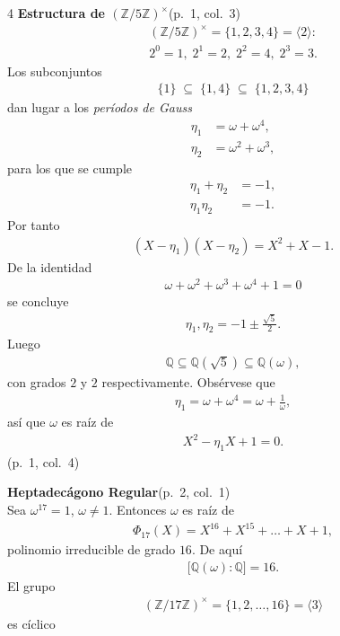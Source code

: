 \documentclass[landscape,a4paper]{article}
\begin{document}
\begin{multicols}{4}
\noindent\textbf{Estructura de $(\mathbb{Z}/5\mathbb{Z})^{\times}$}\hfill (p.~1, col.~3)\\
\begin{align*}
(\mathbb{Z}/5\mathbb{Z})^{\times}=\{1,2,3,4\}=\langle 2\rangle:
\\2^{0}=1,\;2^{1}=2,\;2^{2}=4,\;2^{3}=3.
\end{align*}
Los subconjuntos
\begin{align*}
\{1\}\;\subseteq\;\{1,4\}\;\subseteq\;\{1,2,3,4\}
\end{align*}
dan lugar a los \emph{períodos de Gauss}
\begin{align*}
\eta_{1}&=\omega+\omega^{4},\\
\eta_{2}&=\omega^{2}+\omega^{3},
\end{align*}
para los que se cumple
\begin{align*}
\eta_{1}+\eta_{2}&=-1,\\
\eta_{1}\eta_{2}&=-1.
\end{align*}
Por tanto
\begin{align*}
(X-\eta_{1})(X-\eta_{2})=X^{2}+X-1.
\end{align*}
De la identidad
\begin{align*}
\omega+\omega^{2}+\omega^{3}+\omega^{4}+1=0
\end{align*}
se concluye
\begin{align*}
\eta_{1},\eta_{2}= -1\pm\frac{\sqrt{5}}{2}.
\end{align*}
Luego
\begin{align*}
\mathbb{Q}\subseteq\mathbb{Q}(\sqrt{5})\subseteq\mathbb{Q}(\omega),
\end{align*}
con grados $2$ y $2$ respectivamente.  
Obsérvese que
\begin{align*}
\eta_{1}= \omega+\omega^{4}= \omega+\frac{1}{\omega},
\end{align*}
así que $\omega$ es raíz de
\begin{align*}
X^{2}-\eta_{1}X+1=0.
\end{align*}
(p.~1, col.~4)

\noindent\textbf{Heptadecágono Regular}\hfill (p.~2, col.~1)\\
Sea $\omega^{17}=1$, $\omega\neq 1$.  Entonces $\omega$ es raíz de
\begin{align*}
\Phi_{17}(X)=X^{16}+X^{15}+\dots+X+1,
\end{align*}
polinomio irreducible de grado $16$.  De aquí
\begin{align*}
\bigl[\mathbb{Q}(\omega):\mathbb{Q}\bigr]=16.
\end{align*}
El grupo
\begin{align*}
(\mathbb{Z}/17\mathbb{Z})^{\times}=\{1,2,\dots,16\}=\langle 3\rangle
\end{align*}
es cíclico 


\end{multicols}
\end{document}

